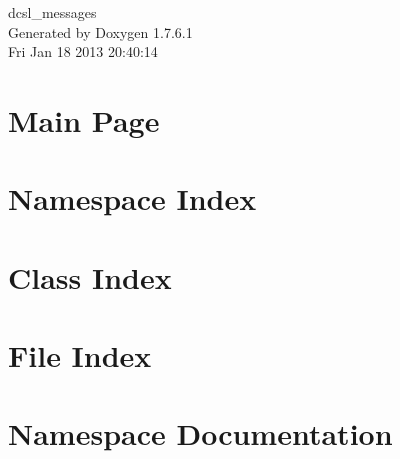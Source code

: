 \documentclass[a4paper]{book}
\begin{document}
\begin{titlepage}
\vspace*{7cm}
\begin{center}
{\Large dcsl\-\_\-messages }\\
\vspace*{1cm}
{\large \-Generated by Doxygen 1.7.6.1}\\
\vspace*{0.5cm}
{\small Fri Jan 18 2013 20:40:14}\\
\end{center}
\end{titlepage}
\clearemptydoublepage
{}
\tableofcontents
\clearemptydoublepage
{}
\chapter{\-Main \-Page}
\label{index}
\chapter{\-Namespace \-Index}

\chapter{\-Class \-Index}

\chapter{\-File \-Index}

\chapter{\-Namespace \-Documentation}








\end{document}
